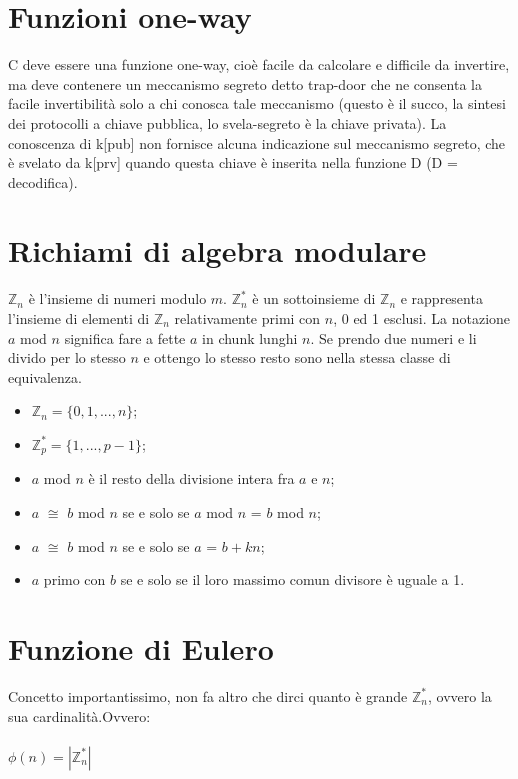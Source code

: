 \section{Funzioni one-way}

C deve essere una funzione one-way, cioè facile da calcolare e difficile da invertire, ma deve contenere un meccanismo segreto detto trap-door che ne consenta la facile invertibilità solo a chi conosca tale meccanismo (questo è il succo, la sintesi dei protocolli a chiave pubblica, lo svela-segreto è la chiave privata). La conoscenza di k[pub] non fornisce alcuna indicazione sul meccanismo segreto, che è svelato da k[prv] quando questa chiave è inserita nella funzione D (D = decodifica).

\section{Richiami di algebra modulare}

$\mathbb{Z}_n$ è l'insieme di numeri modulo $m$. $\mathbb{Z}^{*}_n$ è un sottoinsieme di $\mathbb{Z}_n$ e rappresenta l'insieme di elementi di $\mathbb{Z}_n$ relativamente primi con $n$, 0 ed 1 esclusi. La notazione $a$ mod $n$ significa fare a fette $a$ in chunk lunghi $n$. Se prendo due numeri e li divido per lo stesso $n$ e ottengo lo stesso resto sono nella stessa classe di equivalenza.

\begin{itemize}
	\item $\mathbb{Z}_n = \{0, 1, ..., n\}$;
	\item $\mathbb{Z}^{*}_p = \{1, ..., p - 1\}$;
	\item $a$ mod $n$ è il resto della divisione intera fra $a$ e $n$;
	\item $a$ $\cong$ $b$ mod $n$ se e solo se $a$ mod $n$ = $b$ mod $n$;
	\item $a$ $\cong$ $b$ mod $n$ se e solo se $a$ = $b + kn$; 
	\item $a$ primo con $b$ se e solo se il loro massimo comun divisore è uguale a 1.
\end{itemize}

\section{Funzione di Eulero}

Concetto importantissimo, non fa altro che dirci quanto è grande $\mathbb{Z}^{*}_n$, ovvero la sua cardinalità.Ovvero:\\\\
$\phi(n) = |\mathbb{Z}^{*}_n|$
